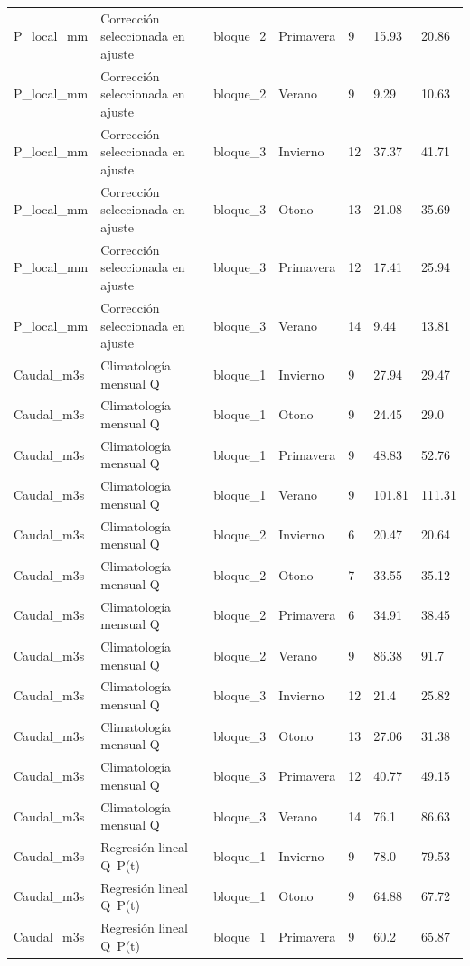 \begin{longtable}{lllllll}
P\_local\_mm & Corrección seleccionada en ajuste & bloque\_2 & Primavera & 9 & 15.93 & 20.86 \\
P\_local\_mm & Corrección seleccionada en ajuste & bloque\_2 & Verano & 9 & 9.29 & 10.63 \\
P\_local\_mm & Corrección seleccionada en ajuste & bloque\_3 & Invierno & 12 & 37.37 & 41.71 \\
P\_local\_mm & Corrección seleccionada en ajuste & bloque\_3 & Otono & 13 & 21.08 & 35.69 \\
P\_local\_mm & Corrección seleccionada en ajuste & bloque\_3 & Primavera & 12 & 17.41 & 25.94 \\
P\_local\_mm & Corrección seleccionada en ajuste & bloque\_3 & Verano & 14 & 9.44 & 13.81 \\
Caudal\_m3s & Climatología mensual Q & bloque\_1 & Invierno & 9 & 27.94 & 29.47 \\
Caudal\_m3s & Climatología mensual Q & bloque\_1 & Otono & 9 & 24.45 & 29.0 \\
Caudal\_m3s & Climatología mensual Q & bloque\_1 & Primavera & 9 & 48.83 & 52.76 \\
Caudal\_m3s & Climatología mensual Q & bloque\_1 & Verano & 9 & 101.81 & 111.31 \\
Caudal\_m3s & Climatología mensual Q & bloque\_2 & Invierno & 6 & 20.47 & 20.64 \\
Caudal\_m3s & Climatología mensual Q & bloque\_2 & Otono & 7 & 33.55 & 35.12 \\
Caudal\_m3s & Climatología mensual Q & bloque\_2 & Primavera & 6 & 34.91 & 38.45 \\
Caudal\_m3s & Climatología mensual Q & bloque\_2 & Verano & 9 & 86.38 & 91.7 \\
Caudal\_m3s & Climatología mensual Q & bloque\_3 & Invierno & 12 & 21.4 & 25.82 \\
Caudal\_m3s & Climatología mensual Q & bloque\_3 & Otono & 13 & 27.06 & 31.38 \\
Caudal\_m3s & Climatología mensual Q & bloque\_3 & Primavera & 12 & 40.77 & 49.15 \\
Caudal\_m3s & Climatología mensual Q & bloque\_3 & Verano & 14 & 76.1 & 86.63 \\
Caudal\_m3s & Regresión lineal Q~P(t) & bloque\_1 & Invierno & 9 & 78.0 & 79.53 \\
Caudal\_m3s & Regresión lineal Q~P(t) & bloque\_1 & Otono & 9 & 64.88 & 67.72 \\
Caudal\_m3s & Regresión lineal Q~P(t) & bloque\_1 & Primavera & 9 & 60.2 & 65.87 \\

\end{longtable}
